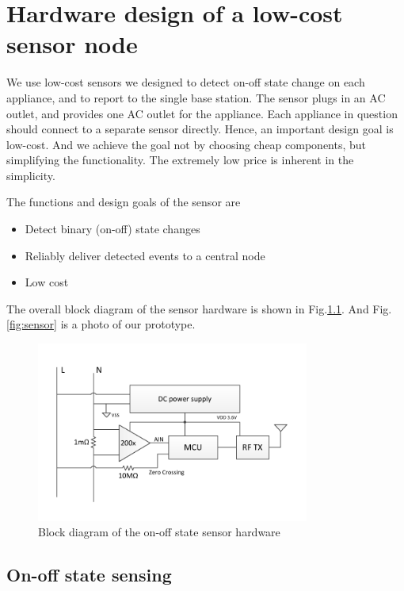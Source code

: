 \chapter{Hardware design of a low-cost sensor node}\label{chap3}

We use low-cost sensors we designed to detect on-off state change on each appliance, and to report to the single base station. The sensor plugs in an AC outlet, and provides one AC outlet for the appliance. Each appliance in question should connect to a separate sensor directly. Hence, an important design goal is low-cost. And we achieve the goal not by choosing cheap components, but simplifying the functionality. The extremely low price is inherent in the simplicity. 


The functions and design goals of the sensor are
\begin{itemize}
  \item Detect binary (on-off) state changes
  \item Reliably deliver detected events to a central node
  \item Low cost
\end{itemize}

The overall block diagram of the sensor hardware is shown in Fig.\ref{fig:hwoverview}. And Fig.\ref{fig:sensor} is a photo of our prototype. 

\begin{figure}[htb]
  \centering
  \includegraphics[width=0.8\textwidth]{figures/hwoverview}
  \caption{Block diagram of the on-off state sensor hardware}
  \label{fig:hwoverview}
\end{figure}

\section{On-off state sensing}

